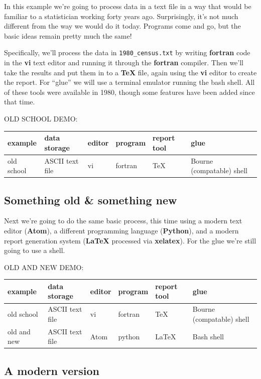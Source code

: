 \documentclass[
]{book}
\begin{document}
In this example we're going to process data in a text file in a way that would be familiar to a statistician working forty years ago. Surprisingly, it's not much different from the way we would do it today. Programs come and go, but the basic ideas remain pretty much the same!

Specifically, we'll process the data in \texttt{1980\_census.txt} by writing \textbf{fortran} code in the \textbf{vi} text editor and running it through the \textbf{fortran} compiler. Then we'll take the results and put them in to a \textbf{TeX} file, again using the \textbf{vi} editor to create the report. For ``glue'' we will use a terminal emulator running the bash shell. All of these tools were available in 1980, though some features have been added since that time.

OLD SCHOOL DEMO:

\begin{longtable}[]{@{}llllll@{}}
\toprule
example & data storage & editor & program & report tool & glue\tabularnewline
\midrule
\endhead
old school & ASCII text file & vi & fortran & TeX & Bourne (compatable) shell\tabularnewline
\bottomrule
\end{longtable}

\hypertarget{something-old-something-new}{%
\subsection{Something old \& something new}\label{something-old-something-new}}

Next we're going to do the same basic process, this time using a modern text editor (\textbf{Atom}), a different programming language (\textbf{Python}), and a modern report generation system (\textbf{LaTeX} processed via \textbf{xelatex}). For the glue we're still going to use a shell.

OLD AND NEW DEMO:

\begin{longtable}[]{@{}llllll@{}}
\toprule
example & data storage & editor & program & report tool & glue\tabularnewline
\midrule
\endhead
old school & ASCII text file & vi & fortran & TeX & Bourne (compatable) shell\tabularnewline
old and new & ASCII text file & Atom & python & LaTeX & Bash shell\tabularnewline
\bottomrule
\end{longtable}

\hypertarget{a-modern-version}{%
\subsection{A modern version}\label{a-modern-version}}
\end{document}
